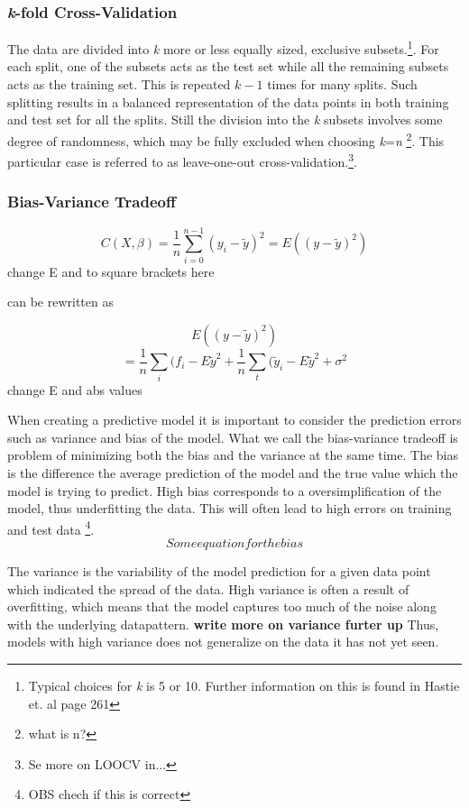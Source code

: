 \documentclass[12pt]{article}
\begin{document}
\begin{multicols}{2}
\subsubsection{\textit{k}-fold Cross-Validation}
 
The data are divided into \textit{k} more or less equally sized, exclusive subsets.\footnote{Typical choices for \textit{k} is 5 or 10. Further information on this is found in Hastie et. al page 261}. For each split, one of the subsets acts as the test set while all the remaining subsets acts as the training set. This is repeated $\textit{k}-1$ times for many splits. Such splitting results in a balanced representation of the data points in both training and test set for all the splits. Still the division into the \textit{k} subsets involves some degree of randomness, which may be fully excluded when choosing \textit{k}=\textit{n} \footnote{what is n?}. This particular case is referred to as leave-one-out cross-validation.\footnote{Se more on LOOCV in...}. 

\subsubsection{Bias-Variance Tradeoff}


$$C(X,\beta)=\frac{1}{n}\sum\limits_{i=0}^{n-1}(y_i-\tilde{y})^2=E((y-\tilde{y})^2)$$
change E and to square brackets here

can be rewritten as 

$$E((y-\tilde{y})^2)$$
$$=\frac{1}{n}\sum\limits_i(f_i-E\tilde{y}^2+\frac{1}{n}\sum\limits_t(\tilde{y}_i-E\tilde{y}^2+\sigma^2$$
change E and abs values

When creating a predictive model it is important to consider the prediction errors such as variance and bias of the model. What we call the bias-variance tradeoff is problem of minimizing both the bias and the variance at the same time. The bias is the difference the average prediction of the model and the true value which the model is trying to predict. High bias corresponds to a oversimplification of the model, thus underfitting the data. This will often lead to high errors on training and test data \footnote{OBS chech if this is correct}. 
$$Some equation for the bias$$
   
The variance is the variability of the model prediction for a given data point which indicated the spread of the data. High variance is often a result of overfitting, which means that the model captures too much of the noise along with the underlying datapattern. \textbf{write more on variance furter up} Thus, models with high variance does not generalize on the data it has not yet seen. 


\end{multicols}
\end{document}
